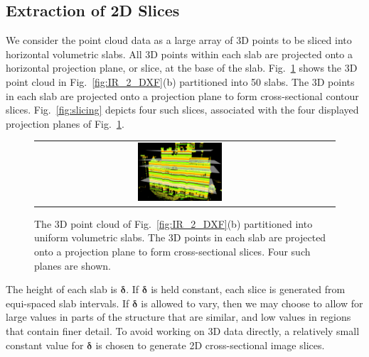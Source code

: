 \documentclass[review]{acmsiggraph}       %
\newcommand{\Fig}[1]{Fig.~\ref{fig:#1}}
\newcommand{\Figb}[1]{Fig.~\ref{fig:#1}(b)}
\begin{document}
\subsection{Extraction of 2D Slices}
\label{sec:image_slicing}

We consider the point cloud data as a large array of 3D points to be
sliced into horizontal volumetric slabs.
All 3D points within each slab are projected onto a horizontal projection
plane, or slice, at the base of the slab.
\Fig{slice_slab} shows the 3D point cloud in \Figb{IR_2_DXF} partitioned into
50 slabs.
The 3D points in each slab are projected onto a projection plane to
form cross-sectional contour slices.
\Fig{slicing} depicts four such slices, associated with the four displayed
projection planes of \Fig{slice_slab}.

\begin{figure} [htbp]
\begin{center}
\begin{tabular}{cc}
\includegraphics[width=0.3\textwidth]{slab_planar.png}
\end{tabular}
\end{center}
\caption{The 3D point cloud of \Figb{IR_2_DXF} partitioned into uniform
volumetric slabs.
The 3D points in each slab are projected onto a projection plane to
form cross-sectional slices. Four such planes are shown.}
\label{fig:slice_slab}
\end{figure}

The height of each slab is $\boldsymbol{\delta}$.
If $\boldsymbol{\delta}$ is held constant, each slice is generated from
equi-spaced slab intervals.
If $\boldsymbol{\delta}$ is allowed to vary, then we may
choose to allow for large values in parts of the structure that are similar,
and low values in regions that contain finer detail.
To avoid working on 3D data directly, a relatively small constant value
for $\boldsymbol{\delta}$ is chosen to generate 2D cross-sectional image slices.
\end{document}
